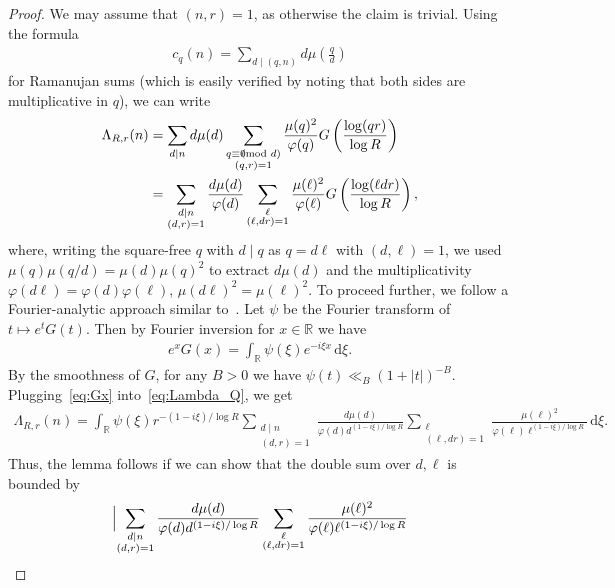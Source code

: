 \documentclass[12pt]{amsart}
\theoremstyle{definition}
\theoremstyle{remark}
\numberwithin{equation}{section}
\newcommand{\1}{\mathbf{1}}
\newcommand{\R}{{\mathbb R}}
\renewcommand\d{\,\mathrm{d}}
\let\oldpmod\pmod
\renewcommand{\pmod}[1]{\hspace{-0.12cm}\oldpmod {#1}}
\begin{document}
\begin{proof}
We may assume that $(n,r)=1$, as otherwise the claim is trivial.     Using the formula
	\begin{align*}
	   c_q(n)=\sum_{d\mid (q,n)}d\mu\left(\frac{q}{d}\right)  
	\end{align*}
	for Ramanujan sums (which is easily verified by noting that both sides are multiplicative in $q$), we can write
	\begin{align}
		\Lambda_{R,r}(n)&=\sum_{d\mid n}d\mu(d)\sum_{\substack{q\equiv 0\pmod d\\ (q,r)=1}}\frac{\mu(q)^2}{\varphi(q)}G\left(\frac{\log(qr)}{\log R}\right)\nonumber\\
		&=\sum_{\substack{d\mid n\\ (d,r)=1}}\frac{d\mu(d)}{\varphi(d)}\sum_{\substack{\ell \\ (\ell,dr)=1}}\frac{\mu(\ell)^2}{\varphi(\ell)}G\left(\frac{\log (\ell dr)}{\log R}\right),\label{eq:Lambda_Q}
	\end{align}
    where, writing the square-free $q$ with $d\mid q$ as $q=d\ell$ with $(d,\ell)=1$, we used $\mu(q)\mu(q/d)=\mu(d)\mu(q)^2$ to extract $d\mu(d)$ and the multiplicativity $\varphi(d\ell)=\varphi(d)\varphi(\ell)$, $\mu(d\ell)^2=\mu(\ell)^2$. To proceed further, we follow a Fourier-analytic approach similar to~\cite[equation (37)]{polymath}. Let $\psi$ be the Fourier transform of $t\mapsto e^t G(t)$. Then by Fourier inversion for $x\in \mathbb{R}$ we have
	\begin{align}\label{eq:Gx}
		e^xG(x) =\int_{\mathbb{R}}\psi(\xi)e^{-i\xi x}\d \xi.   
	\end{align}
	By the smoothness of $G$, for any $B>0$ we have $\psi(t)\ll_B (1+|t|)^{-B}$. Plugging~\eqref{eq:Gx} into~\eqref{eq:Lambda_Q}, we get
    \begin{align*}
        \Lambda_{R,r}(n)= \int_{\R}\psi(\xi) r^{-(1-i\xi)/\log R
        } \sum_{\substack{d\mid n\\ (d,r)=1}}\frac{d\mu(d)}{\varphi(d)d^{(1-i\xi)/\log R
        }}\sum_{\substack{\ell \\ (\ell,dr)=1}}\frac{\mu(\ell)^2}{\varphi(\ell)\ell^{(1-i\xi)/\log R
        }}\d \xi.
    \end{align*}
    Thus, the lemma follows if we can show that the double sum over $d,\ell$ is bounded by
    \begin{align}\label{eq:dellbound}
        \Bigl|\sum_{\substack{d\mid n\\ (d,r)=1}}\frac{d\mu(d)}{\varphi(d)d^{(1-i\xi)/\log R
        }}\sum_{\substack{\ell \\(\ell,dr)=1}}\frac{\mu(\ell)^2}{\varphi(\ell)\ell^{(1-i\xi)/\log R
}}
\end{align}
\end{proof}
\end{document}
